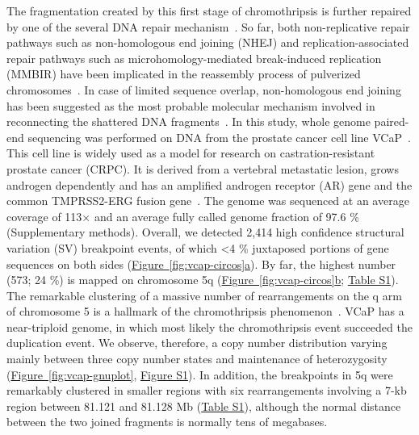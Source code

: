 The fragmentation created by this first stage of chromothripsis is further repaired by one of the several DNA repair mechanism~\cite{holland2012chromoanagenesis}.
So far, both non-replicative repair pathways such as non-homologous end joining (NHEJ) and replication-associated repair pathways such as microhomology-mediated
break-induced replication (MMBIR) have been implicated in the reassembly process of pulverized chromosomes~\cite{forment2012chromothripsis}. In case of limited sequence
overlap, non-homologous end joining has been suggested as the most probable molecular mechanism involved in reconnecting the shattered DNA fragments~\cite{rausch2012genome}.
In this study, whole genome paired-end sequencing was performed on DNA from the prostate cancer cell line VCaP~\cite{drmanac2010human}. This cell line is widely
used as a model for research on castration-resistant prostate cancer (CRPC). It is derived from a vertebral metastatic lesion, grows androgen dependently and
has an amplified androgen receptor (AR) gene and the common TMPRSS2-ERG fusion gene~\cite{korenchuk2001vcap}. The genome was sequenced at an average coverage
of 113× and an average fully called genome fraction of 97.6 \% (Supplementary methods). Overall, we detected 2,414 high confidence structural variation (SV)
breakpoint events, of which <4 \% juxtaposed portions of gene sequences on both sides (\hyperref[fig:vcap-circos]{Figure~\ref*{fig:vcap-circos}a}). By far, the highest number (573; 24 \%) is
 mapped on chromosome 5q (\hyperref[fig:vcap-circos]{Figure~\ref*{fig:vcap-circos}b}; \href{https://link.springer.com/article/10.1007/s00439-013-1308-1#SupplementaryMaterial}{Table S1}). The remarkable clustering of a massive number of rearrangements on the q arm of chromosome 5 is
a hallmark of the chromothripsis phenomenon~\cite{forment2012chromothripsis}. VCaP has a near-triploid genome, in which most likely the chromothripsis event succeeded
the duplication event. We observe, therefore, a copy number distribution varying mainly between three copy number states and maintenance of heterozygosity
(\hyperref[vcap-gnuplot]{Figure~\ref*{fig:vcap-gnuplot}}, \href{https://link.springer.com/article/10.1007/s00439-013-1308-1#SupplementaryMaterial}{Figure S1}). In addition, the breakpoints in 5q were remarkably clustered in smaller regions with six rearrangements involving a 7-kb
region between 81.121 and 81.128 Mb (\href{https://link.springer.com/article/10.1007/s00439-013-1308-1#SupplementaryMaterial}{Table S1}), although the normal distance between the two joined fragments is normally tens of megabases.

